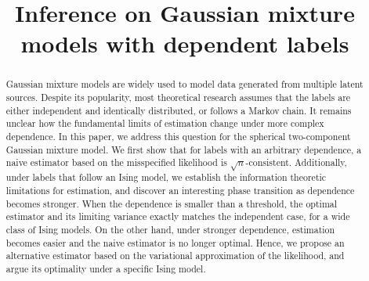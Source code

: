 \documentclass[preprint,reqno]{imsart}
\begin{document}
\begin{frontmatter}

\title{Inference on Gaussian mixture models with dependent labels}
%
%


\begin{abstract}
    Gaussian mixture models are widely used to model data generated from multiple latent sources. Despite its popularity, most theoretical research assumes that the labels are either independent and identically distributed, or follows a Markov chain.  It remains unclear how the fundamental limits of estimation change under more complex dependence. In this paper, we address this question for the spherical two-component Gaussian mixture model.
    We first show that for labels with an arbitrary dependence, a naive estimator based on the misspecified likelihood is $\sqrt{n}$-consistent. Additionally, under labels that follow an Ising model, we establish the information theoretic limitations for estimation, and discover an interesting phase transition as dependence becomes stronger. %
    When the dependence is smaller than a threshold, the optimal estimator and its limiting variance exactly matches the independent case, for a wide class of Ising models. %
    On the other hand, under stronger dependence, estimation becomes easier and the naive estimator is no longer optimal. Hence, we propose an alternative estimator based on the variational approximation of the likelihood, and argue its optimality under a specific Ising model. %
\end{abstract}

\begin{keyword}[class=MSC]
%
%
\end{keyword}

\begin{keyword}
\end{keyword}

\end{frontmatter}
\end{document}
